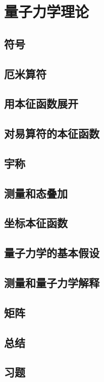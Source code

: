 \chapter{量子力学理论}
\section{符号}

\section{厄米算符}

\section{用本征函数展开}

\section{对易算符的本征函数}

\section{宇称}

\section{测量和态叠加}

\section{坐标本征函数}

\section{量子力学的基本假设}

\section{测量和量子力学解释}

\section{矩阵}

\section*{总结}

\section*{习题}